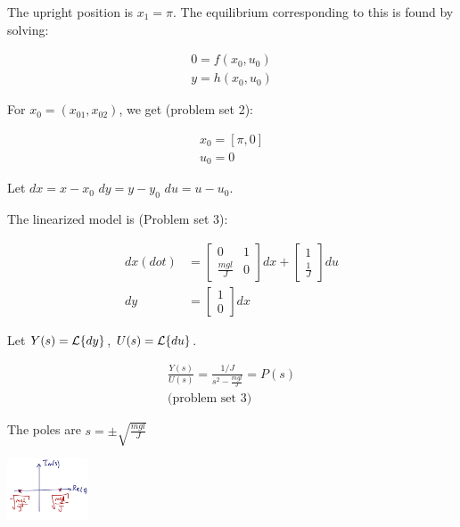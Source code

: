 \begin{enumerate}
\begin{itemize}
                    The upright position is $x_1 =\pi$. The equilibrium corresponding to this is found by solving:

                    \begin{align*}
                        0 = f(x_0, u_0) \\
                        y = h(x_0, u_0)
                    \end{align*}

                    For $x_0 = (x_{01}, x_{02})$, we get (problem set 2):

                    \begin{align*}
                        x_0 = [\pi, 0]  \\
                        u_0 = 0
                    \end{align*}

                    Let $dx = x - x_0$ \text{, } $dy = y - y_0$ \text{, } $du = u - u_0$.

                    The linearized model is (Problem set 3):

                    \begin{align*}
                        dx(dot) &= \begin{bmatrix} 0 & 1 \\ \frac{mgl}{J} & 0  \end{bmatrix} dx + \begin{bmatrix} 1 \\ \frac{1}{J} \end{bmatrix} du \\
                        dy &= \begin{bmatrix} 1 \\ 0 \end{bmatrix} dx
                    \end{align*}

                    Let $Y(s) = \mathcal{L}\{dy\}$, $U(s) = \mathcal{L}\{du\}$.

                    \begin{align*}
                        \frac{Y(s)}{U(s)} = \frac{1/J}{s^2 - \frac{mgl}{J}} = P(s) \\
                        \text{(problem set 3)}
                    \end{align*}

                    The poles are $s = \pm \sqrt{\frac{mgl}{J}}$

                    \includegraphics[width=90px,keepaspectratio]{images/5-2-a.png}


\end{itemize}
\end{enumerate}
